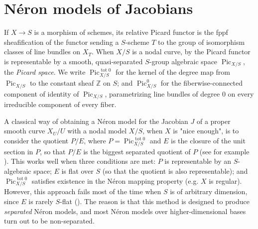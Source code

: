 \documentclass[a4paper,10pt,twoside]{article}
\newcommand{\on}[1]{\operatorname{#1}}
\newcommand{\Z}{\mathbb{Z}}
\DeclareMathOperator{\pic}{Pic}
\theoremstyle{definition}
\theoremstyle{remark}
\renewcommand{\on}[1]{\operatorname{#1}}
\begin{document}


\section{N\'eron models of Jacobians}\label{sec6}

If $X\to S$ is a morphism of schemes, its relative Picard functor is the fppf sheafification of the functor sending a $S$-scheme $T$ to the group of isomorphism classes of line bundles on $X_T$. When $X/S$ is a nodal curve, by \cite[Theorem 8.3.1; Theorem 9.4.1]{NeronModels} the Picard functor is representable by a smooth, quasi-separated $S$-group algebraic space $\pic_{X/S}$, the \emph{Picard space}. We write $\pic^{\on{tot}0}_{X/S}$ for the kernel of the degree map from $\pic_{X/S}$ to the constant sheaf $\Z$ on $S$; and $\pic^{0}_{X/S}$ for the fiberwise-connected component of identity of $\pic_{X/S}$, parametrizing line bundles of degree $0$ on every irreducible component of every fiber.

A classical way of obtaining a N\'eron model for the Jacobian $J$ of a proper smooth curve $X_U/U$ with a nodal model $X/S$, when $X$ is "nice enough", is to consider the quotient $P/E$, where $P=\pic^{\on{tot}0}_{X/S}$ and $E$ is the closure of the unit section in $P$, so that $P/E$ is the biggest separated quotient of $P$ (see for example \cite[9.5]{NeronModels}). This works well when three conditions are met: $P$ is representable by an $S$-algebraic space; $E$ is flat over $S$ (so that the quotient is also representable); and $\pic^{\on{tot}0}_{X/S}$ satisfies existence in the N\'eron mapping property (e.g. $X$ is regular). However, this approach fails most of the time when $S$ is of arbitrary dimension, since $E$ is rarely $S$-flat (\cite[Theorem 5.16]{Holmes}). The reason is that this method is designed to produce \emph{separated} Néron models, and most Néron models over higher-dimensional bases turn out to be non-separated.
\end{document}
